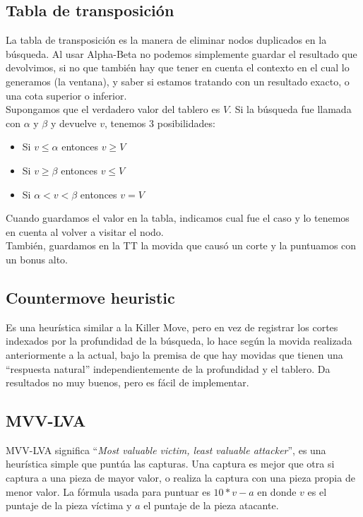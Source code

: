 \documentclass{article}
\begin{document}
\subsection{Tabla de transposición}
La tabla de transposición es la manera de eliminar nodos duplicados
en la búsqueda. Al usar Alpha-Beta no podemos simplemente guardar el
resultado que devolvimos, si no que también hay que tener en cuenta
el contexto en el cual lo generamos (la ventana), y saber si estamos
tratando con un resultado exacto, o una cota superior o inferior.
\\

Supongamos que el verdadero valor del tablero es $V$. Si la búsqueda
fue llamada con $\alpha$ y $\beta$ y devuelve $v$, tenemos 3
posibilidades:

\begin{itemize}
\item Si $v \le \alpha$ entonces $v \ge V$
\item Si $v \ge \beta$ entonces $v \le V$
\item Si $\alpha < v < \beta$ entonces $v = V$
\end{itemize}

Cuando guardamos el valor en la tabla, indicamos cual fue el caso y lo
tenemos en cuenta al volver a visitar el nodo.
\\

También, guardamos en la TT la movida que causó un corte y la
puntuamos con un bonus alto.

\subsection{Countermove heuristic}
Es una heurística similar a la Killer Move, pero en vez de registrar
los cortes indexados por la profundidad de la búsqueda, lo hace según
la movida realizada anteriormente a la actual, bajo la premisa de que
hay movidas que tienen una ``respuesta natural'' independientemente de
la profundidad y el tablero. Da resultados no muy buenos, pero es fácil
de implementar.
\\

\subsection{MVV-LVA}
MVV-LVA significa ``\emph{Most valuable victim, least valuable
attacker}'', es una heurística simple que puntúa las capturas. Una
captura es mejor que otra si captura a una pieza de mayor valor, o
realiza la captura con una pieza propia de menor valor. La fórmula
usada para puntuar es $10*v - a$ en donde $v$ es el puntaje de la pieza
víctima y $a$ el puntaje de la pieza atacante.
\\
\end{document}
